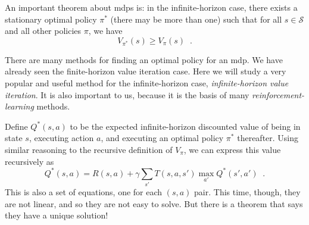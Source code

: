 An important theorem about {\sc mdp}s is: in the infinite-horizon case, there exists a stationary
optimal policy $\pi^*$ (there may be more than one) such that for all
$s \in \mathcal S$ and all other policies $\pi$, we have 
\begin{equation}
 V_{\pi^*}(s) \ge V_{\pi}(s) \;\;.
\end{equation}


There are many methods for finding an optimal policy for an {\sc mdp}.
We have already seen the finite-horizon value iteration case.  Here we
will study a very popular and useful method for the infinite-horizon
case, {\em infinite-horizon value iteration}.  It is also important to
us, because it is the basis of many {\em reinforcement-learning}
methods.

Define $Q^*(s, a)$ to be the expected infinite-horizon discounted
value of being in state $s$, executing action $a$, and executing
an optimal  policy $\pi^*$ thereafter.  Using similar reasoning to the
recursive definition  of  $V_\pi$,  we can express this value
recursively as
\begin{equation}
 Q^*(s, a) = R(s, a) + \gamma\sum_{s'}T(s, a, s')\max_{a'}Q^*(s',
a') \;\;.
\end{equation} 
This is also a set of equations, one for each $(s, a)$ pair.  This
time, though, they are not linear, and so they are not easy to solve.
But there is a theorem  that says they have a unique solution!


